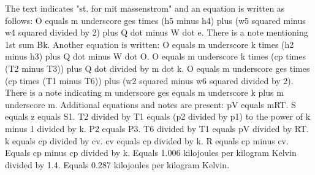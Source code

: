 The text indicates "st. for mit massenstrom" and an equation is written as follows: 
O equals m underscore ges times (h5 minus h4) plus (w5 squared minus w4 squared divided by 2) plus Q dot minus W dot e. 
There is a note mentioning 1st sum Bk. 
Another equation is written: 
O equals m underscore k times (h2 minus h3) plus Q dot minus W dot O. 
O equals m underscore k times (cp times (T2 minus T3)) plus Q dot divided by m dot k. 
O equals m underscore ges times (cp times (T1 minus T6)) plus (w2 squared minus w6 squared divided by 2). 
There is a note indicating m underscore ges equals m underscore k plus m underscore m. 
Additional equations and notes are present: 
pV equals mRT. 
S equals z equals S1. 
T2 divided by T1 equals (p2 divided by p1) to the power of k minus 1 divided by k. 
P2 equals P3. 
T6 divided by T1 equals pV divided by RT. 
k equals cp divided by cv. 
cv equals cp divided by k. 
R equals cp minus cv. 
Equals cp minus cp divided by k. 
Equals 1.006 kilojoules per kilogram Kelvin divided by 1.4. 
Equals 0.287 kilojoules per kilogram Kelvin.